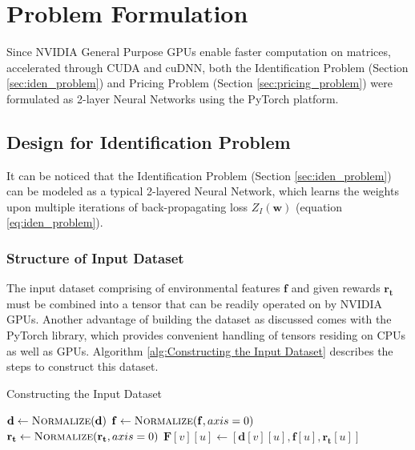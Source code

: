 \documentclass[12pt]{article}
\newcommand{\vect}[1]{\mathbf{#1}}
\newcommand{\matr}[1]{\mathbf{#1}}
\begin{document}
    \section{Problem Formulation}
    Since NVIDIA General Purpose GPUs enable faster computation on matrices, accelerated through CUDA and cuDNN, both the Identification Problem (Section \ref{sec:iden_problem}) and Pricing Problem (Section \ref{sec:pricing_problem}) were formulated as 2-layer Neural Networks using the PyTorch platform.
    
    \subsection{Design for Identification Problem}
    It can be noticed that the Identification Problem (Section \ref{sec:iden_problem}) can be modeled as a typical 2-layered Neural Network, which learns the weights upon multiple iterations of back-propagating loss $Z_I(\matr{w})$ (equation \ref{eq:iden_problem}).
    
    \subsubsection{Structure of Input Dataset}
    The input dataset comprising of environmental features $\vect{f}$ and given rewards $\vect{r_t}$ must be combined into a tensor that can be readily operated on by NVIDIA GPUs. Another advantage of building the dataset as discussed comes with the PyTorch library, which provides convenient handling of tensors residing on CPUs as well as GPUs. Algorithm \ref{alg:Constructing the Input Dataset} describes the steps to construct this dataset.
    \begin{algorithm}
        \caption{Constructing the Input Dataset} \label{alg:Constructing the Input Dataset}
        \begin{algorithmic}[1]
            \State $\mathbf{d} \gets \Call{Normalize}{\mathbf{d}}$
            \State $\mathbf{f} \gets \Call{Normalize}{\mathbf{f}, axis = 0}$
            \State $\mathbf{r_t} \gets \Call{Normalize}{\mathbf{r_t}, axis = 0}$
                    \State $\mathbf{F}[v][u] \gets [\mathbf{d}[v][u], \mathbf{f}[u], \mathbf{r_t}[u]]$
                \EndFor
            \EndFor
        \end{algorithmic}
    \end{algorithm}
    
\end{document}
